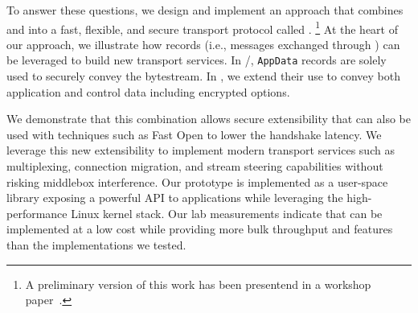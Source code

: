 To answer these questions, we design and implement an approach that combines
\tcp and  into a fast, flexible, and secure transport protocol called \textbf{\tcpls}.
%
\footnote{A preliminary version of this work has been presentend in a workshop
  paper~\cite{rochet2020tcpls}.}  At the heart of our approach, we illustrate
how \tls records (i.e., messages exchanged through \tls) can be leveraged to
build new transport services. In \tcp/\tls, \tls \texttt{AppData} records are
solely used to securely convey the \tcp bytestream. In \tcpls, we extend their
use to convey both application and control data including encrypted \tcp
options.

We demonstrate that this combination allows secure extensibility that can also
be used with techniques such as \tcp Fast Open \cite{rfc7413} to lower the
handshake latency. We leverage this new extensibility to implement modern transport services such as multiplexing, connection migration, and stream steering capabilities without risking middlebox interference. Our \tcpls prototype is implemented as a user-space library exposing a powerful API to applications %
while leveraging the high-performance Linux kernel \tcp stack. Our lab measurements indicate that \tcpls can be implemented at a low cost while providing more bulk throughput and features than the \quic implementations we tested.


